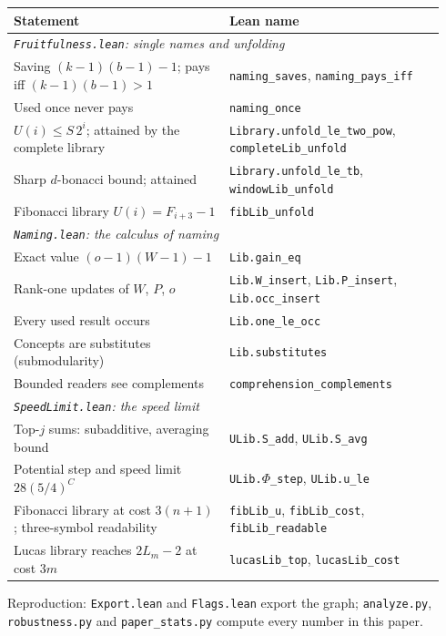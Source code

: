 \documentclass[11pt]{article}
\theoremstyle{remark}
\newcommand{\lean}[1]{\texttt{#1}}
\begin{document}
\begin{center}\small
\begin{tabular}{p{0.47\linewidth}p{0.47\linewidth}}
\toprule
Statement & Lean name \\
\midrule
\multicolumn{2}{l}{\emph{\lean{Fruitfulness.lean}: single names and unfolding}}\\
Saving $(k-1)(b-1)-1$; pays iff $(k-1)(b-1)>1$ & \lean{naming\_saves}, \lean{naming\_pays\_iff} \\
Used once never pays & \lean{naming\_once} \\
$U(i)\le S\,2^i$; attained by the complete library & \lean{Library.unfold\_le\_two\_pow}, \lean{completeLib\_unfold} \\
Sharp $d$-bonacci bound; attained & \lean{Library.unfold\_le\_tb}, \lean{windowLib\_unfold} \\
Fibonacci library $U(i)=F_{i+3}-1$ & \lean{fibLib\_unfold} \\
\midrule
\multicolumn{2}{l}{\emph{\lean{Naming.lean}: the calculus of naming}}\\
Exact value $(o-1)(W-1)-1$ & \lean{Lib.gain\_eq} \\
Rank-one updates of $W$, $P$, $o$ & \lean{Lib.W\_insert}, \lean{Lib.P\_insert}, \lean{Lib.occ\_insert} \\
Every used result occurs & \lean{Lib.one\_le\_occ} \\
Concepts are substitutes (submodularity) & \lean{Lib.substitutes} \\
Bounded readers see complements & \lean{comprehension\_complements} \\
\midrule
\multicolumn{2}{l}{\emph{\lean{SpeedLimit.lean}: the speed limit}}\\
Top-$j$ sums: subadditive, averaging bound & \lean{ULib.S\_add}, \lean{ULib.S\_avg} \\
Potential step and speed limit $28(5/4)^C$ & \lean{ULib.}$\Phi$\lean{\_step}, \lean{ULib.u\_le} \\
Fibonacci library at cost $3(n+1)$; three-symbol readability & \lean{fibLib\_u}, \lean{fibLib\_cost}, \lean{fibLib\_readable} \\
Lucas library reaches $2L_m-2$ at cost $3m$ & \lean{lucasLib\_top}, \lean{lucasLib\_cost} \\
\bottomrule
\end{tabular}
\end{center}

\noindent Reproduction: \lean{Export.lean} and \lean{Flags.lean} export the graph;
\lean{analyze.py}, \lean{robustness.py} and \lean{paper\_stats.py} compute every number in
this paper.
\end{document}
